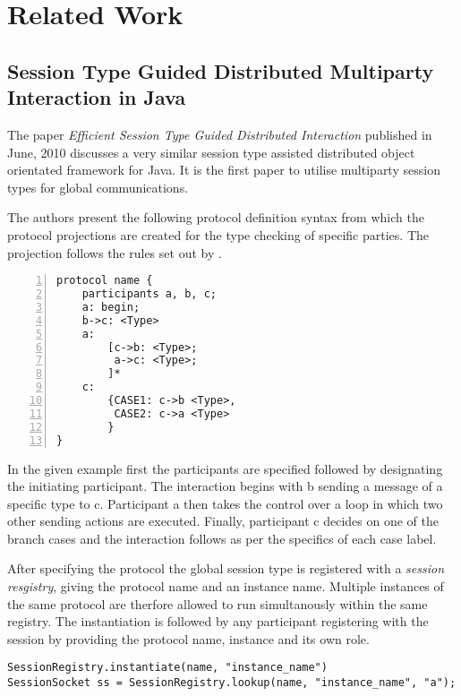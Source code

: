 \cleardoublepage
\chapter{Related Work}
\label{ch:related}

	
\section{Session Type Guided Distributed Multiparty Interaction in Java}
\label{sec:mpstjava}

The paper \textit{Efficient Session Type Guided Distributed Interaction} \cite{sess_type_guided_distr_interact} published in June, 2010 discusses a very similar session type assisted distributed object orientated framework for Java. It is the first paper to utilise multiparty session types for global communications.

The authors present the following protocol definition syntax from which the protocol projections are created for the type checking of specific parties. The projection follows the rules set out by \cite{multiparty_sess_types}.

\begin{lstlisting}[basicstyle=\LISTINGSTYLE, numbers=left]
protocol name {
	participants a, b, c;
	a: begin;
	b->c: <Type>
	a:
		[c->b: <Type>;
		 a->c: <Type>;
		]*
	c: 
		{CASE1: c->b <Type>,
		 CASE2: c->a <Type>
		} 
} 
\end{lstlisting}

In the given example first the participants are specified followed by designating the initiating participant. The interaction begins with b sending a message of a specific type to c. Participant a then takes the control over a loop in which two other sending actions are executed. Finally, participant c decides on one of the branch cases and the interaction follows as per the specifics of each case label.  

After specifying the protocol the global session type is registered with a \textit{session resgistry}, giving the protocol name and an instance name. Multiple instances of the same protocol are therfore allowed to run simultanously within the same registry. The instantiation is followed by any participant registering with the session by providing the protocol name, instance and its own role.

\begin{lstlisting}[basicstyle=\LISTINGSTYLE]
SessionRegistry.instantiate(name, "instance_name")
SessionSocket ss = SessionRegistry.lookup(name, "instance_name", "a");
\end{lstlisting}

